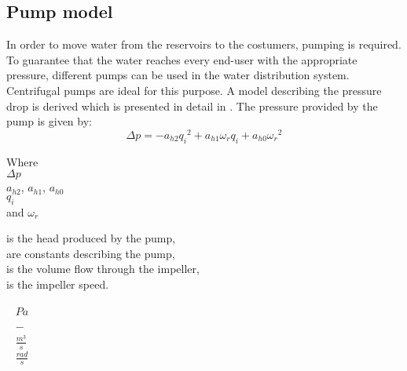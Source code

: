 \subsection{Pump model} 
\label{PumpModel}
In order to move water from the reservoirs to the costumers, pumping is required. To guarantee that the water reaches every end-user with the appropriate pressure, different pumps can be used in the water distribution system.\\
Centrifugal pumps are ideal for this purpose. 
A model describing the pressure drop is derived which is presented in detail in \cite{Phd_Carsten}. The pressure provided by the pump is given by:
\begin{equation}
  \Delta p = -a_{h2}{q_i}^2 + a_{h1} \omega_r q_i + a_{h0}{\omega_r}^2
  \label{PumpModel}
\end{equation}

\begin{minipage}[t]{0.20\textwidth}
Where\\
\hspace*{8mm} $\Delta p$ \\
\hspace*{8mm} $a_{h2}$, $a_{h1}$, $a_{h0}$ \\
\hspace*{8mm} $q_i$ \\
and \hspace*{0.7mm} $\omega_r$ 

\end{minipage}
\begin{minipage}[t]{0.68\textwidth}
\vspace*{2mm}
is the head produced by the pump,\\
are constants describing the pump,\\
is the volume flow through the impeller,\\
is the impeller speed.
\end{minipage}
\begin{minipage}[t]{0.10\textwidth}
\vspace*{2mm}
\textcolor{White}{te}$\unit{Pa}$\\
\textcolor{White}{te}$\unit{-}$\\
\textcolor{White}{te}$\unit{\frac{m^3}{s}}$\\
\textcolor{White}{te}$\unit{\frac{rad}{s}}$
\end{minipage}	


